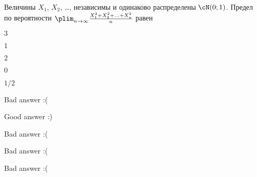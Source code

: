 
\begin{question}
Величины \(X_1\), \(X_2\), \ldots, независимы и одинаково распределены
\(\cN(0;1)\). Предел по вероятности
\(\plim_{n\to\infty} \frac{X_1^2+ X_2^2 + \ldots + X_n^2}{n}\) равен
\begin{answerlist}
  \item \(3\)
  \item \(1\)
  \item \(2\)
  \item \(0\)
  \item \(1/2\)
\end{answerlist}
\end{question}

\begin{solution}
\begin{answerlist}
  \item Bad answer :(
  \item Good answer :)
  \item Bad answer :(
  \item Bad answer :(
  \item Bad answer :(
\end{answerlist}
\end{solution}

